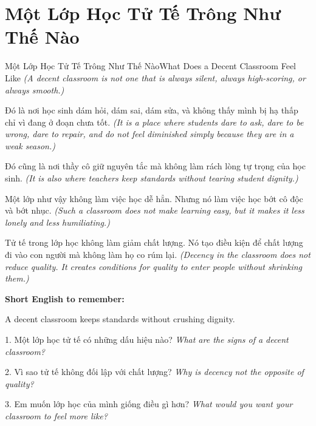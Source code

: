 \section{Một Lớp Học Tử Tế Trông Như Thế Nào}
\begin{truyen}{Một Lớp Học Tử Tế Trông Như Thế Nào}{What Does a Decent Classroom Feel Like}
\textit{(A decent classroom is not one that is always silent, always high-scoring, or always smooth.)}

Đó là nơi học sinh dám hỏi, dám sai, dám sửa, và không thấy mình bị hạ thấp chỉ vì đang ở đoạn chưa tốt.
\textit{(It is a place where students dare to ask, dare to be wrong, dare to repair, and do not feel diminished simply because they are in a weak season.)}

Đó cũng là nơi thầy cô giữ nguyên tắc mà không làm rách lòng tự trọng của học sinh.
\textit{(It is also where teachers keep standards without tearing student dignity.)}

Một lớp như vậy không làm việc học dễ hẳn. Nhưng nó làm việc học bớt cô độc và bớt nhục.
\textit{(Such a classroom does not make learning easy, but it makes it less lonely and less humiliating.)}
\end{truyen}

\begin{baihoc}
Tử tế trong lớp học không làm giảm chất lượng. Nó tạo điều kiện để chất lượng đi vào con người mà không làm họ co rúm lại.
\textit{(Decency in the classroom does not reduce quality. It creates conditions for quality to enter people without shrinking them.)}
\end{baihoc}

\begin{ghinhoanh}
\textbf{Short English to remember:}

A decent classroom keeps standards without crushing dignity.

\end{ghinhoanh}

\begin{tuhocnhanh}
1. Một lớp học tử tế có những dấu hiệu nào? \textit{What are the signs of a decent classroom?}

2. Vì sao tử tế không đối lập với chất lượng? \textit{Why is decency not the opposite of quality?}

3. Em muốn lớp học của mình giống điều gì hơn? \textit{What would you want your classroom to feel more like?}
\end{tuhocnhanh}
\ngancach


